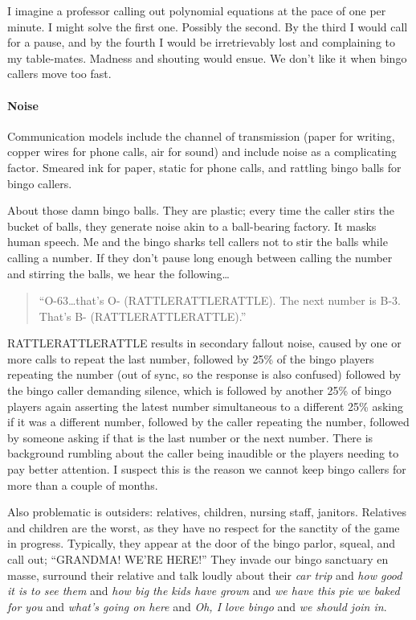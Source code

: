 \documentclass[
  letterpaper,
  DIV=11,
  numbers=noendperiod]{scrartcl}
\let\oldparagraph\paragraph
\renewcommand{\paragraph}[1]{\oldparagraph{#1}\mbox{}}
\begin{document}
I imagine a professor calling out polynomial equations at the pace of
one per minute. I might solve the first one. Possibly the second. By the
third I would call for a pause, and by the fourth I would be
irretrievably lost and complaining to my table-mates. Madness and
shouting would ensue. We don't like it when bingo callers move too fast.

\hypertarget{noise}{%
\paragraph{Noise}\label{noise}}

Communication models include the channel of transmission (paper for
writing, copper wires for phone calls, air for sound) and include noise
as a complicating factor. Smeared ink for paper, static for phone calls,
and rattling bingo balls for bingo callers.

About those damn bingo balls. They are plastic; every time the caller
stirs the bucket of balls, they generate noise akin to a ball-bearing
factory. It masks human speech. Me and the bingo sharks tell callers not
to stir the balls while calling a number. If they don't pause long
enough between calling the number and stirring the balls, we hear the
following\ldots{}

\begin{quote}
``O-63\ldots that's O- (RATTLERATTLERATTLE). The next number is B-3.
That's B- (RATTLERATTLERATTLE).''
\end{quote}

RATTLERATTLERATTLE results in secondary fallout noise, caused by one or
more calls to repeat the last number, followed by 25\% of the bingo
players repeating the number (out of sync, so the response is also
confused) followed by the bingo caller demanding silence, which is
followed by another 25\% of bingo players again asserting the latest
number simultaneous to a different 25\% asking if it was a different
number, followed by the caller repeating the number, followed by someone
asking if that is the last number or the next number. There is
background rumbling about the caller being inaudible or the players
needing to pay better attention. I suspect this is the reason we cannot
keep bingo callers for more than a couple of months.

Also problematic is outsiders: relatives, children, nursing staff,
janitors. Relatives and children are the worst, as they have no respect
for the sanctity of the game in progress. Typically, they appear at the
door of the bingo parlor, squeal, and call out; ``GRANDMA! WE'RE HERE!''
They invade our bingo sanctuary en masse, surround their relative and
talk loudly about their \emph{car trip} and \emph{how good it is to see
them} and \emph{how big the kids have grown} and \emph{we have this pie
we baked for you} and \emph{what's going on here} and \emph{Oh, I love
bingo} and \emph{we should join in}.
\end{document}
